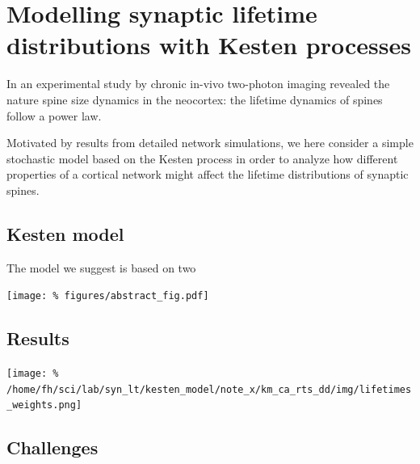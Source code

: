 \columnbreak
\section*{\LARGE Modelling synaptic lifetime distributions with Kesten processes}

In an experimental study by \textcite{Loewenstein2015} chronic in-vivo two-photon imaging revealed the nature spine size dynamics in the neocortex: the lifetime dynamics of spines follow a power law.

Motivated by results from detailed network simulations, we here consider a simple stochastic model based on the Kesten process in order to analyze how different properties of a cortical network might affect the lifetime distributions of synaptic spines.

\subsection*{Kesten model}

The model we suggest is based on two 

\begin{center}\vspace{1cm}
  \texttt{[image: \%
    figures/abstract\_fig.pdf]}
\end{center}\vspace{1cm}


\subsection*{Results}

\begin{center}\vspace{1cm}
  \texttt{[image: \%
    /home/fh/sci/lab/syn\_lt/kesten\_model/note\_x/km\_ca\_rts\_dd/img/lifetimes\_weights.png]}

\end{center}\vspace{1cm}

\subsection*{Challenges}


